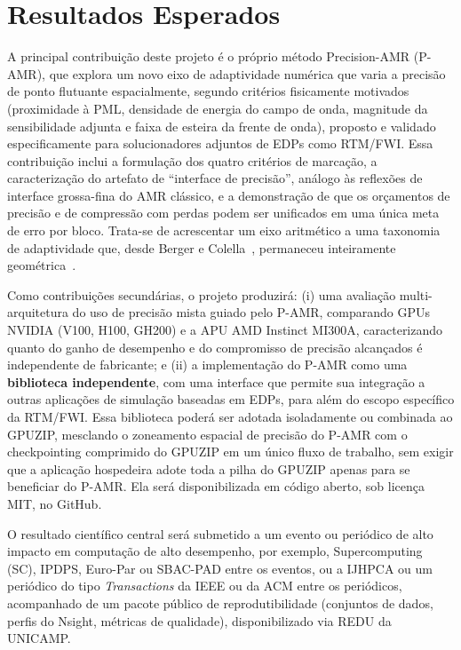 \documentclass[12pt,a4paper]{article}
\newcommand{\pamr}{P\nobreakdash-AMR}
\begin{document}
\section{Resultados Esperados}

A principal contribuição deste projeto é o próprio
método Precision-AMR (\pamr{}), que explora um novo eixo de adaptividade numérica
que varia a precisão de ponto flutuante espacialmente, segundo critérios
fisicamente motivados (proximidade à PML, densidade de energia do campo de
onda, magnitude da sensibilidade adjunta e faixa de esteira da frente de
onda), proposto e validado especificamente para solucionadores adjuntos de
EDPs como RTM/FWI. Essa contribuição inclui a formulação dos quatro
critérios de marcação, a caracterização do artefato de ``interface de
precisão'', análogo às reflexões de interface grossa-fina do AMR clássico, e a demonstração de que os orçamentos de precisão e de compressão com
perdas podem ser unificados em uma única meta de erro por bloco. Trata-se de
acrescentar um eixo aritmético a uma taxonomia de adaptividade que, desde
Berger e Colella~\cite{berger1989amr}, permaneceu inteiramente
geométrica~\cite{vivarelli2025review}.

Como contribuições secundárias, o projeto produzirá: (i) uma avaliação
multi-arquitetura do uso de precisão mista guiado pelo P-AMR, comparando GPUs
NVIDIA (V100, H100, GH200) e a APU AMD Instinct MI300A, caracterizando
quanto do ganho de desempenho e do compromisso de precisão alcançados é
independente de fabricante; e (ii) a implementação do P-AMR como uma
\textbf{biblioteca independente}, com uma interface que permite sua
integração a outras aplicações de simulação baseadas em EDPs, para além do
escopo específico da RTM/FWI. Essa biblioteca poderá ser adotada
isoladamente ou combinada ao GPUZIP, mesclando o zoneamento espacial de
precisão do P-AMR com o checkpointing comprimido do GPUZIP em um único fluxo
de trabalho, sem exigir que a aplicação hospedeira adote toda a pilha do
GPUZIP apenas para se beneficiar do P-AMR. Ela será disponibilizada
em código aberto, sob licença MIT, no GitHub.

O resultado científico central será submetido a um evento ou periódico de
alto impacto em computação de alto desempenho, por exemplo,
Supercomputing (SC), IPDPS, Euro-Par ou SBAC-PAD entre os eventos, ou a
IJHPCA ou um periódico do tipo \emph{Transactions} da IEEE ou da ACM entre
os periódicos, acompanhado de um pacote público de reprodutibilidade
(conjuntos de dados, perfis do Nsight, métricas de qualidade),
disponibilizado via REDU da UNICAMP.
\end{document}
